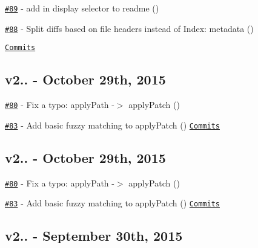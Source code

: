 \begin{DoxyItemize}
\item \href{https://github.com/kpdecker/jsdiff/pull/89}{\tt \#89} -\/ add in display selector to readme (\href{https://api.github.com/users/FranDias}{\tt })
\item \href{https://github.com/kpdecker/jsdiff/pull/88}{\tt \#88} -\/ Split diffs based on file headers instead of \textquotesingle{}Index\+:\textquotesingle{} metadata (\href{https://api.github.com/users/piranna}{\tt })
\end{DoxyItemize}

\href{https://github.com/kpdecker/jsdiff/compare/v2.2.0...v2.2.1}{\tt Commits}

\subsection*{v2.. -\/ October 29th, 2015}


\begin{DoxyItemize}
\item \href{https://github.com/kpdecker/jsdiff/pull/80}{\tt \#80} -\/ Fix a typo\+: apply\+Path -\/$>$ apply\+Patch (\href{https://api.github.com/users/fluxxu}{\tt })
\item \href{https://github.com/kpdecker/jsdiff/pull/83}{\tt \#83} -\/ Add basic fuzzy matching to apply\+Patch (\href{https://github.com/piranna}{\tt }) \href{https://github.com/kpdecker/jsdiff/compare/v2.2.0...v2.2.0}{\tt Commits}
\end{DoxyItemize}

\subsection*{v2.. -\/ October 29th, 2015}


\begin{DoxyItemize}
\item \href{https://github.com/kpdecker/jsdiff/pull/80}{\tt \#80} -\/ Fix a typo\+: apply\+Path -\/$>$ apply\+Patch (\href{https://api.github.com/users/fluxxu}{\tt })
\item \href{https://github.com/kpdecker/jsdiff/pull/83}{\tt \#83} -\/ Add basic fuzzy matching to apply\+Patch (\href{https://github.com/piranna}{\tt }) \href{https://github.com/kpdecker/jsdiff/compare/v2.1.3...v2.2.0}{\tt Commits}
\end{DoxyItemize}

\subsection*{v2.. -\/ September 30th, 2015}


